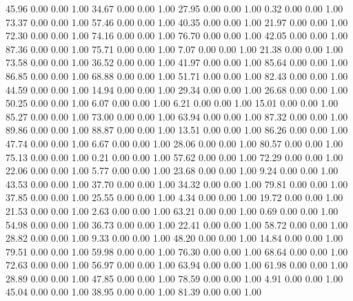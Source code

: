    45.96   0.00   0.00   1.00
   34.67   0.00   0.00   1.00
   27.95   0.00   0.00   1.00
    0.32   0.00   0.00   1.00
   73.37   0.00   0.00   1.00
   57.46   0.00   0.00   1.00
   40.35   0.00   0.00   1.00
   21.97   0.00   0.00   1.00
   72.30   0.00   0.00   1.00
   74.16   0.00   0.00   1.00
   76.70   0.00   0.00   1.00
   42.05   0.00   0.00   1.00
   87.36   0.00   0.00   1.00
   75.71   0.00   0.00   1.00
    7.07   0.00   0.00   1.00
   21.38   0.00   0.00   1.00
   73.58   0.00   0.00   1.00
   36.52   0.00   0.00   1.00
   41.97   0.00   0.00   1.00
   85.64   0.00   0.00   1.00
   86.85   0.00   0.00   1.00
   68.88   0.00   0.00   1.00
   51.71   0.00   0.00   1.00
   82.43   0.00   0.00   1.00
   44.59   0.00   0.00   1.00
   14.94   0.00   0.00   1.00
   29.34   0.00   0.00   1.00
   26.68   0.00   0.00   1.00
   50.25   0.00   0.00   1.00
    6.07   0.00   0.00   1.00
    6.21   0.00   0.00   1.00
   15.01   0.00   0.00   1.00
   85.27   0.00   0.00   1.00
   73.00   0.00   0.00   1.00
   63.94   0.00   0.00   1.00
   87.32   0.00   0.00   1.00
   89.86   0.00   0.00   1.00
   88.87   0.00   0.00   1.00
   13.51   0.00   0.00   1.00
   86.26   0.00   0.00   1.00
   47.74   0.00   0.00   1.00
    6.67   0.00   0.00   1.00
   28.06   0.00   0.00   1.00
   80.57   0.00   0.00   1.00
   75.13   0.00   0.00   1.00
    0.21   0.00   0.00   1.00
   57.62   0.00   0.00   1.00
   72.29   0.00   0.00   1.00
   22.06   0.00   0.00   1.00
    5.77   0.00   0.00   1.00
   23.68   0.00   0.00   1.00
    9.24   0.00   0.00   1.00
   43.53   0.00   0.00   1.00
   37.70   0.00   0.00   1.00
   34.32   0.00   0.00   1.00
   79.81   0.00   0.00   1.00
   37.85   0.00   0.00   1.00
   25.55   0.00   0.00   1.00
    4.34   0.00   0.00   1.00
   19.72   0.00   0.00   1.00
   21.53   0.00   0.00   1.00
    2.63   0.00   0.00   1.00
   63.21   0.00   0.00   1.00
    0.69   0.00   0.00   1.00
   54.98   0.00   0.00   1.00
   36.73   0.00   0.00   1.00
   22.41   0.00   0.00   1.00
   58.72   0.00   0.00   1.00
   28.82   0.00   0.00   1.00
    9.33   0.00   0.00   1.00
   48.20   0.00   0.00   1.00
   14.84   0.00   0.00   1.00
   79.51   0.00   0.00   1.00
   59.98   0.00   0.00   1.00
   76.30   0.00   0.00   1.00
   68.64   0.00   0.00   1.00
   72.63   0.00   0.00   1.00
   56.97   0.00   0.00   1.00
   63.94   0.00   0.00   1.00
   61.98   0.00   0.00   1.00
   28.89   0.00   0.00   1.00
   47.85   0.00   0.00   1.00
   78.59   0.00   0.00   1.00
    4.91   0.00   0.00   1.00
   45.04   0.00   0.00   1.00
   38.95   0.00   0.00   1.00
   81.39   0.00   0.00   1.00
